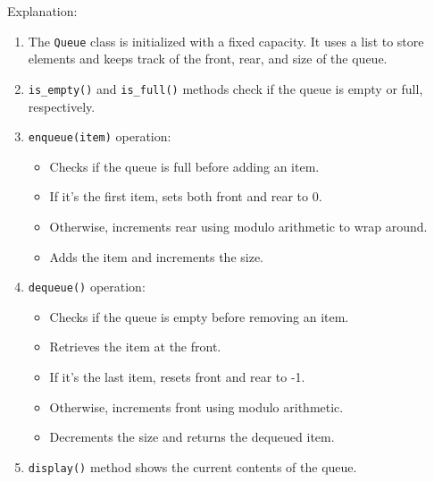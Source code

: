 \begin{Shaded}
\begin{Highlighting}[]
\OperatorTok{=}\NormalTok{)}

\NormalTok{)}
\NormalTok{)}
\NormalTok{)}


\NormalTok{)}
\NormalTok{)}
\NormalTok{)}


\NormalTok{)}
\end{Highlighting}
\end{Shaded}

Explanation:

\begin{enumerate}
\def\labelenumi{\arabic{enumi}.}
\item
  The \texttt{Queue} class is initialized with a fixed capacity. It uses
  a list to store elements and keeps track of the front, rear, and size
  of the queue.
\item
  \texttt{is\_empty()} and \texttt{is\_full()} methods check if the
  queue is empty or full, respectively.
\item
  \texttt{enqueue(item)} operation:

  \begin{itemize}
  \tightlist
  \item
    Checks if the queue is full before adding an item.
  \item
    If it's the first item, sets both front and rear to 0.
  \item
    Otherwise, increments rear using modulo arithmetic to wrap around.
  \item
    Adds the item and increments the size.
  \end{itemize}
\item
  \texttt{dequeue()} operation:

  \begin{itemize}
  \tightlist
  \item
    Checks if the queue is empty before removing an item.
  \item
    Retrieves the item at the front.
  \item
    If it's the last item, resets front and rear to -1.
  \item
    Otherwise, increments front using modulo arithmetic.
  \item
    Decrements the size and returns the dequeued item.
  \end{itemize}
\item
  \texttt{display()} method shows the current contents of the queue.
\end{enumerate}

